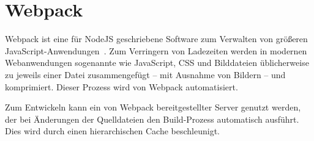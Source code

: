 \section{Webpack}
\label{sec:g_webpack}

Webpack ist eine für NodeJS geschriebene Software zum Verwalten von größeren
JavaScript-Anwendungen~\cite{webpack}.  Zum Verringern von Ladezeiten werden in
modernen Webanwendungen sogenannte  wie JavaScript,
CSS und Bilddateien üblicherweise zu jeweils einer Datei zusammengefügt -- mit
Ausnahme von Bildern -- und komprimiert.  Dieser Prozess wird von Webpack
automatisiert.

Zum Entwickeln kann ein von Webpack bereitgestellter Server genutzt werden, der
bei Änderungen der Quelldateien den Build-Prozess automatisch ausführt.
Dies wird durch einen hierarchischen Cache beschleunigt.



